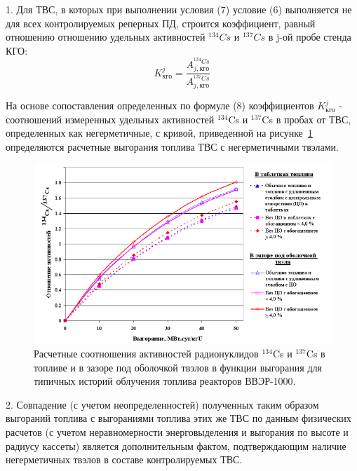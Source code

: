 1. Для ТВС, в которых при выполнении условия (7) условие (6)
выполняется не для всех контролируемых реперных ПД, строится
коэффициент, равный отношению отношению удельных активностей $^{134}Cs$ и
$^{137}Cs$ в j-ой пробе стенда КГО:
\begin{equation} \label{eq:Kcs}
	{K}_{кго}^{j} = \frac{A_{j,кго}^{^{134}Cs}}{A_{j,кго}^{^{137}Cs}}
\end{equation}

На основе сопоставления определенных по формуле (8)
коэффициентов ${K}_{кго}^{j}$ - соотношений измеренных удельных активностей $^{134}$Cs и $^{137}$Cs в пробах от ТВС, определенных как негерметичные, с кривой, приведенной на рисунке~\ref{fig:ris3} определяются расчетные выгорания топлива ТВС с негерметичными твэлами.

\begin{figure}[H]
	\centering
	\includegraphics[width=1\linewidth]{pics/ris3} %
	\caption{Расчетные соотношения активностей радионуклидов $^{134}$Cs и $^{137}$Cs в топливе и в зазоре под оболочкой твэлов в функции выгорания для типичных историй облучения топлива реакторов ВВЭР-1000.\cite{RD}}
	\label{fig:ris3} %
\end{figure}

2. Совпадение (с учетом неопределенностей) полученных таким образом
выгораний топлива с выгораниями топлива этих же ТВС по данным
физических расчетов (с учетом неравномерности энерговыделения и
выгорания по высоте и радиусу кассеты) является дополнительным фактом,
подтверждающим наличие негерметичных твэлов в составе контролируемых
ТВС.